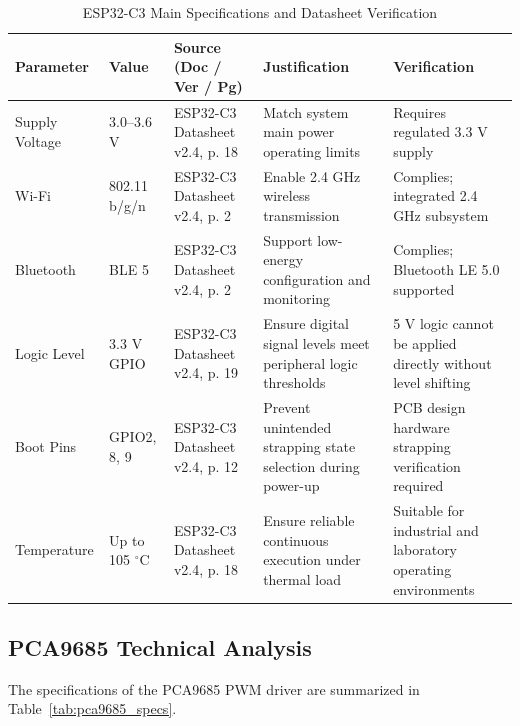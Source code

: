 \documentclass[lettersize,journal]{IEEEtran}
\begin{document}
	\begin{table}[!t]
		\centering
		\caption{ESP32-C3 Main Specifications and Datasheet Verification \cite{esp32c3}}
		\label{tab:esp32_specs}
		\scriptsize
		
		\setlength{\tabcolsep}{2pt}
		\renewcommand{\arraystretch}{1.1}
		
		\begin{tabularx}{\columnwidth}{@{}P{1.6cm} P{1.5cm} P{2.1cm} X X@{}}
			\toprule
			\textbf{Parameter} & \textbf{Value} & \textbf{Source (Doc / Ver / Pg)} & \textbf{Justification} & \textbf{Verification} \\
			\midrule
			
			Supply Voltage & 
			3.0--3.6 V & 
			ESP32-C3 Datasheet v2.4, p. 18 & 
			Match system main power operating limits & 
			Requires regulated 3.3 V supply \\
			
			Wi-Fi & 
			802.11 b/g/n & 
			ESP32-C3 Datasheet v2.4, p. 2 & 
			Enable 2.4 GHz wireless transmission & 
			Complies; integrated 2.4 GHz subsystem \\
			
			Bluetooth & 
			BLE 5 & 
			ESP32-C3 Datasheet v2.4, p. 2 & 
			Support low-energy configuration and monitoring & 
			Complies; Bluetooth LE 5.0 supported \\
			
			Logic Level & 
			3.3 V GPIO & 
			ESP32-C3 Datasheet v2.4, p. 19 & 
			Ensure digital signal levels meet peripheral logic thresholds & 
			5 V logic cannot be applied directly without level shifting \\
			
			Boot Pins & 
			GPIO2, 8, 9 & 
			ESP32-C3 Datasheet v2.4, p. 12 & 
			Prevent unintended strapping state selection during power-up & 
			PCB design hardware strapping verification required \\
			
			Temperature & 
			Up to 105 $^\circ$C & 
			ESP32-C3 Datasheet v2.4, p. 18 & 
			Ensure reliable continuous execution under thermal load & 
			Suitable for industrial and laboratory operating environments \\
			
			\bottomrule
		\end{tabularx}
	\end{table}
	
	
	
	\subsection{PCA9685 Technical Analysis}
	The specifications of the PCA9685 PWM driver are summarized in Table~\ref{tab:pca9685_specs}.
	
\end{document}
